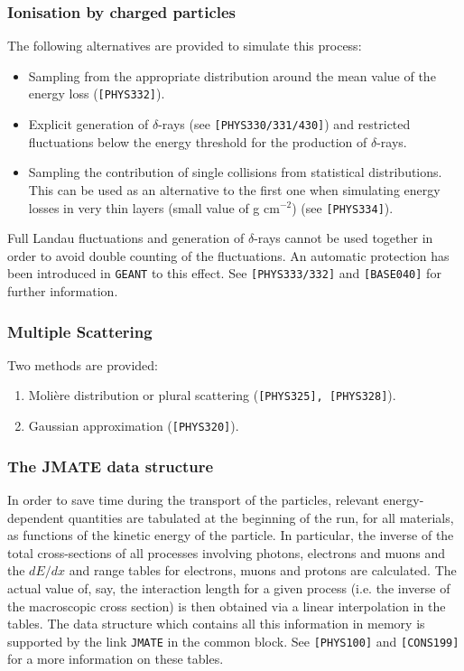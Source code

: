 \subsubsection{Ionisation by charged particles}
The following alternatives are provided to simulate this process:
\begin{itemize}
\item Sampling from the appropriate distribution around the mean value 
of the energy loss ({\tt [PHYS332]}).
\item
Explicit generation of $\delta$-rays (see {\tt [PHYS330/331/430]}) and 
restricted fluctuations below the energy threshold for the production
of $\delta$-rays.
\item
Sampling the contribution of single collisions from statistical 
distributions. This can be used as an alternative to the first one when
simulating energy losses 
in very thin layers (small value of g  cm$^{-2}$) (see {\tt [PHYS334]}).
\end{itemize}
Full Landau fluctuations and generation of $\delta$-rays cannot be used
together in order
to avoid double counting of the fluctuations. An automatic protection
has been introduced in {\tt GEANT} to this effect.
See {\tt [PHYS333/332]} and {\tt [BASE040]} for further information.
 
\subsubsection{Multiple Scattering}
Two methods are provided:
\begin{enumerate}
\item Moli\`ere distribution or plural scattering ({\tt [PHYS325], [PHYS328]}).
\item Gaussian approximation ({\tt [PHYS320]}).
\end{enumerate}
 
\subsubsection{The JMATE data structure}
In order to save time during the transport of the particles, relevant 
energy-dependent quantities are tabulated at the beginning of the run, for 
all materials, as functions of the kinetic energy of the particle.
In particular, the inverse of the total cross-sections 
of all processes involving photons, electrons and muons and the $dE/dx$ and 
range tables for electrons, muons and protons are calculated.
The actual value of, say, the interaction length for a given process (i.e. the
inverse of the macroscopic cross section) is then obtained via a linear
interpolation in the tables. The data structure which contains all this
information in memory is supported by the link {\tt JMATE} in the 
 common block.
See {\tt [PHYS100]} and {\tt [CONS199]} for a more information on these tables.
 
